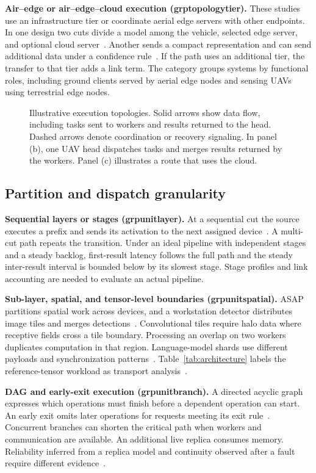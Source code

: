 \documentclass[journal]{IEEEtran}
\newcommand{\groupcite}[2]{\csname grp#1#2\endcsname}
\begin{document}
\textbf{Air--edge or air--edge--cloud execution (\groupcite{topology}{tier}).}
These studies use an infrastructure tier or coordinate aerial edge servers with other endpoints. In one design two cuts divide a model among the vehicle, selected edge server, and optional cloud server~\cite{R0001}. Another sends a compact representation and can send additional data under a confidence rule~\cite{R0080}. If the path uses an additional tier, the transfer to that tier adds a link term. The category groups systems by functional roles, including ground clients served by aerial edge nodes and sensing UAVs using terrestrial edge nodes.

\begin{figure}[!tp]
\centering

\caption{Illustrative execution topologies. Solid arrows show data flow, including tasks sent to workers and results returned to the head. Dashed arrows denote coordination or recovery signaling. In panel (b), one UAV head dispatches tasks and merges results returned by the workers. Panel (c) illustrates a route that uses the cloud.}\label{fig:topologies}
\end{figure}

\subsection{Partition and dispatch granularity}
\textbf{Sequential layers or stages (\groupcite{unit}{layer}).}
At a sequential cut the source executes a prefix and sends its activation to the next assigned device~\cite{R0010,R0092}. A multi-cut path repeats the transition. Under an ideal pipeline with independent stages and a steady backlog, first-result latency follows the full path and the steady inter-result interval is bounded below by its slowest stage. Stage profiles and link accounting are needed to evaluate an actual pipeline.

\textbf{Sub-layer, spatial, and tensor-level boundaries (\groupcite{unit}{spatial}).}
ASAP partitions spatial work across devices, and a workstation detector distributes image tiles and merges detections~\cite{R0014,R0125}. Convolutional tiles require halo data where receptive fields cross a tile boundary. Processing an overlap on two workers duplicates computation in that region. Language-model shards use different payloads and synchronization patterns~\cite{R0074}. Table~\ref{tab:architecture} labels the reference-tensor workload as transport analysis~\cite{R0121}.

\textbf{DAG and early-exit execution (\groupcite{unit}{branch}).}
A directed acyclic graph expresses which operations must finish before a dependent operation can start. An early exit omits later operations for requests meeting its exit rule~\cite{R0075}. Concurrent branches can shorten the critical path when workers and communication are available. An additional live replica consumes memory. Reliability inferred from a replica model and continuity observed after a fault require different evidence~\cite{R0110,R0121}.
\end{document}
